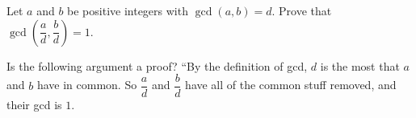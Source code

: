 Let $a$ and $b$ be positive integers with $\gcd(a,b)=d$. Prove that $\gcd\left(\dfrac {a}{d},\dfrac {b}{d}\right)=1$.

Is the following argument a proof? ``By the definition of gcd, $d$ is the most that $a$ and $b$ have in common. So $\dfrac {a}{d}$ and $\dfrac {b}{d}$ have all of the common stuff removed, and their gcd is $1$.
